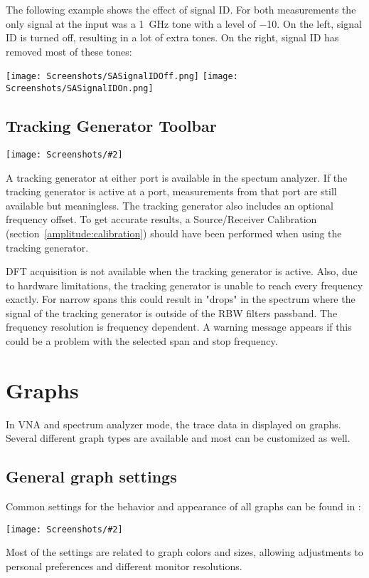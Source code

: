 \documentclass[a4paper,11pt]{article}
\newcommand{\screenshot}[2]{\begin{center}
\texttt{[image: Screenshots/\#2]}
\end{center}}
\begin{document}
\begin{itemize}
The following example shows the effect of signal ID. For both measurements the only signal at the input was a \SI{1}{\giga\hertz} tone with a level of \SI{-10}{\dBm}. On the left, signal ID is turned off, resulting in a lot of extra tones. On the right, signal ID has removed most of these tones:
\begin{center}
\texttt{[image: Screenshots/SASignalIDOff.png]}
\texttt{[image: Screenshots/SASignalIDOn.png]}
\end{center}
\end{itemize}

\subsection{Tracking Generator Toolbar}
\screenshot{0.8}{ToolbarTrackingGenerator.png}
A tracking generator at either port is available in the spectum analyzer. If the tracking generator is active at a port, measurements from that port are still available but meaningless. The tracking generator also includes an optional frequency offset. To get accurate results, a Source/Receiver Calibration (section~\ref{amplitude:calibration}) should have been performed when using the tracking generator.

DFT acquisition is not available when the tracking generator is active. Also, due to hardware limitations, the tracking generator is unable to reach every frequency exactly. For narrow spans this could result in "drops" in the spectrum where the signal of the tracking generator is outside of the RBW filters passband. The frequency resolution is frequency dependent. A warning message appears if this could be a problem with the selected span and stop frequency.

\section{Graphs}
In VNA and spectrum analyzer mode, the trace data in displayed on graphs. Several different graph types are available and most can be customized as well.
\subsection{General graph settings}
Common settings for the behavior and appearance of all graphs can be found in :
\screenshot{1.0}{GraphSettings.png}
Most of the settings are related to graph colors and sizes, allowing adjustments to personal preferences and different monitor resolutions.
\end{document}
